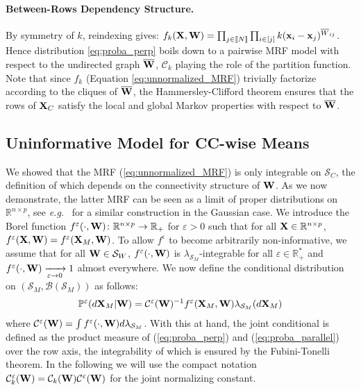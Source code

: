 \paragraph{Between-Rows Dependency Structure.} By symmetry of $k$, reindexing gives: $f_{k}(\mathbf{X}, {\mathbf{W}}) = \prod_{j \in {[\![N]\!]}} \prod_{i \in [j]} k(\mathbf{x}_{i} - \mathbf{x}_{j})^{\overline{W}_{ij}}$. Hence distribution \eqref{eq:proba_perp} boils down to a pairwise MRF model \citep{clifford1990markov} with respect to the undirected graph $\overline{{\mathbf{W}}}$, $\mathcal{C}_{k}$ playing the role of the partition function. Note that since $f_k$ (Equation \ref{eq:unnormalized_MRF}) trivially factorize according to the cliques of $\overline{{\mathbf{W}}}$, the Hammersley-Clifford theorem ensures that the rows of $\mathbf{X}_{C}$ satisfy the local and global Markov properties with respect to $\overline{{\mathbf{W}}}$. 

\subsection{Uninformative Model for CC-wise Means}

We showed that the MRF (\ref{eq:unnormalized_MRF}) is only integrable on $\mathcal{S}_{C}$, the definition of which depends on the connectivity structure of ${\mathbf{W}}$. As we now demonstrate, the latter MRF can be seen as a limit of proper distributions on $\mathbb{R}^{n \times p}$, see \textit{e.g.}\ \citep{rue2005gaussian} for a similar construction in the Gaussian case. 
We introduce the Borel function $f^{\varepsilon}(\cdot, {\mathbf{W}}) \colon \mathbb{R}^{n \times p} \to \mathbb{R}_+$ for $\varepsilon > 0$ such that for all $\mathbf{X} \in \mathbb{R}^{n \times p}$, $f^{\varepsilon}(\mathbf{X}, {\mathbf{W}}) = f^{\varepsilon}(\mathbf{X}_{M}, {\mathbf{W}})$. To allow $f^{\varepsilon}$ to become arbitrarily non-informative, we assume that for all ${\mathbf{W}} \in \mathcal{S}_{W}$, $f^\varepsilon(\cdot, {\mathbf{W}})$ is $\lambda_{\mathcal{S}_{M}}$-integrable for all $\varepsilon \in \mathbb{R}^*_+$ and $f^{\varepsilon}(\cdot, {\mathbf{W}}) \xrightarrow[\varepsilon \to 0]{} 1$ almost everywhere.
We now define the conditional distribution on $(\mathcal{S}_{M}, \mathcal{B}(\mathcal{S}_{M}))$ as follows:
\begin{align}\label{eq:proba_parallel}
     \mathbb{P}^{\varepsilon}(d\mathbf{X}_{M}| {\mathbf{W}}) = \mathcal{C}^{\varepsilon}({\mathbf{W}})^{-1} f^{\varepsilon}(\mathbf{X}_{M}, {\mathbf{W}}) \lambda_{\mathcal{S}_{M}}(d\mathbf{X}_{M})
\end{align}
where $\mathcal{C}^{\varepsilon}({\mathbf{W}}) = \int f^{\varepsilon}(\cdot, {\mathbf{W}}) d\lambda_{\mathcal{S}_{M}}$.
With this at hand, the joint conditional is defined as the product measure of (\ref{eq:proba_perp}) and (\ref{eq:proba_parallel}) over the row axis, the integrability of which is ensured by the Fubini-Tonelli theorem. In the following we will use the compact notation $\mathcal{C}^{\varepsilon}_k({\mathbf{W}}) = \mathcal{C}_k({\mathbf{W}})\mathcal{C}^{\varepsilon}({\mathbf{W}})$ for the joint normalizing constant.

